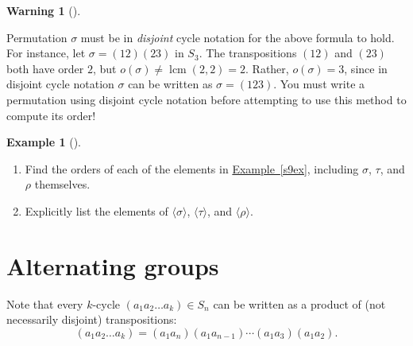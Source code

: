 \documentclass[10pt,]{book}
\theoremstyle{plain}
\theoremstyle{definition}
\theoremstyle{definition}
\newtheorem{warning}[theorem]{Warning}
\theoremstyle{definition}
\newtheorem{example}[theorem]{Example}
\theoremstyle{definition}
\numberwithin{equation}{section}
\DeclareMathOperator{\lcm}{lcm}
\begin{document}
\begin{warning}[]\label{warning-18}

      Permutation \(\sigma\) must be in \emph{disjoint} cycle notation for the above formula to hold. For instance, let \(\sigma=(12)(23)\) in \(S_3\). The transpositions \((12)\) and \((23)\) both have order \(2\), but \(o(\sigma)\neq \lcm(2,2)=2\). Rather, \(o(\sigma)=3\), since in disjoint cycle notation \(\sigma\) can be written as \(\sigma=(123)\). You must write a permutation using disjoint cycle notation before attempting to use this method to compute its order!
\end{warning}
\begin{example}[]\label{example-59}
\leavevmode%
\begin{enumerate}
\item\hypertarget{li-338}{}
            Find the orders of each of the elements in \hyperref[s9ex]{Example~\ref{s9ex}}, including \(\sigma\), \(\tau\), and \(\rho\) themselves.
\item\hypertarget{li-339}{}
            Explicitly list the elements of \(\langle \sigma\rangle\), \(\langle \tau\rangle\), and \(\langle \rho\rangle\).
\end{enumerate}
\end{example}
\typeout{************************************************}
\typeout{************************************************}
\section[{Alternating groups}]{Alternating groups}\label{section-19}

    Note that every \(k\)-cycle \((a_1a_2\ldots a_k)\in S_n\) can be written as a product of (not necessarily disjoint) transpositions:
\begin{equation*}

      (a_1a_2\ldots a_k)=(a_1a_n)(a_1a_{n-1})\cdots(a_1a_3)(a_1a_2).
    
\end{equation*}

\par
\end{document}
